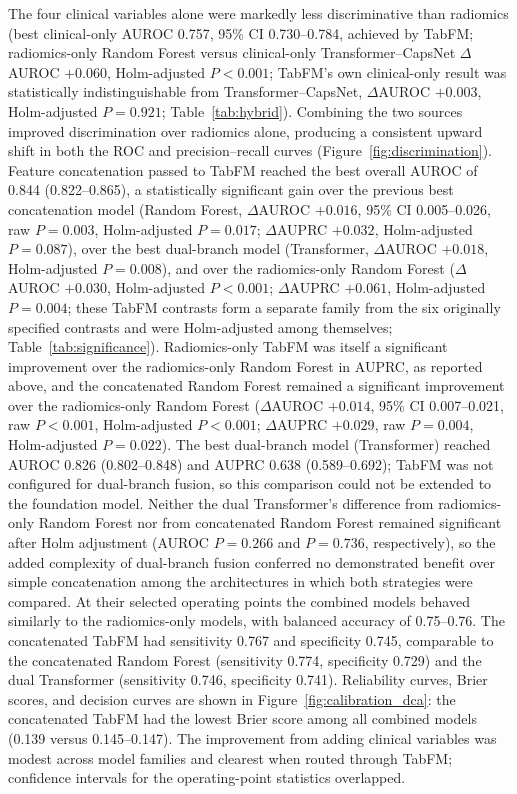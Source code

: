 \documentclass[11pt]{article}
\begin{document}
The four clinical variables alone were markedly less discriminative than
radiomics (best clinical-only AUROC 0.757, 95\% CI 0.730--0.784, achieved by
TabFM; radiomics-only Random Forest versus clinical-only Transformer--CapsNet
$\Delta$AUROC $+0.060$, Holm-adjusted $P<0.001$; TabFM's own clinical-only
result was statistically indistinguishable from Transformer--CapsNet,
$\Delta$AUROC $+0.003$, Holm-adjusted $P=0.921$; Table~\ref{tab:hybrid}).
Combining the two sources improved discrimination over radiomics alone,
producing a consistent upward shift in both the ROC and precision--recall
curves (Figure~\ref{fig:discrimination}). Feature concatenation passed to TabFM
reached the best overall AUROC of 0.844 (0.822--0.865), a statistically
significant gain over the previous best concatenation model (Random Forest,
$\Delta$AUROC $+0.016$, 95\% CI 0.005--0.026, raw $P=0.003$, Holm-adjusted
$P=0.017$; $\Delta$AUPRC $+0.032$, Holm-adjusted $P=0.087$), over the best
dual-branch model (Transformer, $\Delta$AUROC $+0.018$, Holm-adjusted
$P=0.008$), and over the radiomics-only Random Forest ($\Delta$AUROC $+0.030$,
Holm-adjusted $P<0.001$; $\Delta$AUPRC $+0.061$, Holm-adjusted $P=0.004$; these
TabFM contrasts form a separate family from the six originally specified
contrasts and were Holm-adjusted among themselves; Table~\ref{tab:significance}).
Radiomics-only TabFM was itself a significant improvement over the
radiomics-only Random Forest in AUPRC, as reported above, and the concatenated
Random Forest remained a significant improvement over the radiomics-only Random
Forest ($\Delta$AUROC $+0.014$, 95\% CI 0.007--0.021, raw $P<0.001$,
Holm-adjusted $P<0.001$; $\Delta$AUPRC $+0.029$, raw $P=0.004$, Holm-adjusted
$P=0.022$). The best dual-branch model (Transformer) reached AUROC 0.826
(0.802--0.848) and AUPRC 0.638 (0.589--0.692); TabFM was not configured for
dual-branch fusion, so this comparison could not be extended to the foundation
model. Neither the dual Transformer's difference from radiomics-only Random
Forest nor from concatenated Random Forest remained significant after Holm
adjustment (AUROC $P=0.266$ and $P=0.736$, respectively), so the added
complexity of dual-branch fusion conferred no demonstrated benefit over simple
concatenation among the architectures in which both strategies were compared.
At their selected operating points the combined models behaved similarly to the
radiomics-only models, with balanced accuracy of 0.75--0.76. The concatenated
TabFM had sensitivity 0.767 and specificity 0.745, comparable to the
concatenated Random Forest (sensitivity 0.774, specificity 0.729) and the dual
Transformer (sensitivity 0.746, specificity 0.741). Reliability curves, Brier
scores, and decision curves are shown in Figure~\ref{fig:calibration_dca}: the
concatenated TabFM had the lowest Brier score among all combined models (0.139
versus 0.145--0.147). The improvement from adding clinical variables was modest
across model families and clearest when routed through TabFM; confidence
intervals for the operating-point statistics overlapped.
\end{document}
